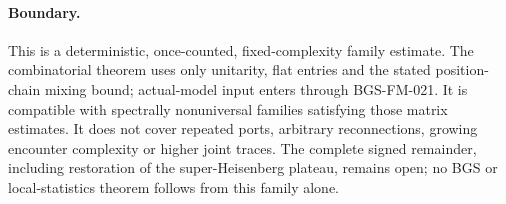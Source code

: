 \paragraph{Boundary.}
This is a deterministic, once-counted, fixed-complexity family estimate.
The combinatorial theorem uses only unitarity, flat entries and the stated
position-chain mixing bound; actual-model input enters through BGS-FM-021.
It is compatible with spectrally nonuniversal families satisfying those
matrix estimates.
It does not cover repeated ports, arbitrary reconnections, growing
encounter complexity or higher joint traces. The complete signed remainder,
including restoration of the super-Heisenberg plateau, remains open;
no BGS or local-statistics theorem follows from this family alone.
